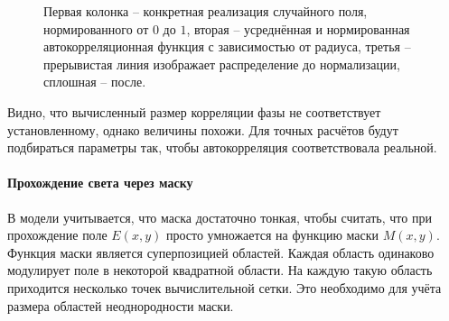 \begin{figure}[h]
	\caption{Первая колонка -- конкретная реализация случайного поля, нормированного от $0$ до $1$, вторая -- усреднённая и нормированная автокорреляционная функция с зависимостью от радиуса, третья -- прерывистая линия изображает распределение до нормализации, сплошная -- после.}
	\label{ris:IncoherentRAD}
\end{figure}
Видно, что вычисленный размер корреляции фазы не соответствует установленному, однако величины похожи. Для точных расчётов будут подбираться параметры так, чтобы автокорреляция соответствовала реальной.


\paragraph{Прохождение света через маску}
В модели учитывается, что маска достаточно тонкая, чтобы считать, что при прохождение поле $E(x,y)$ просто умножается на функцию маски $M(x,y)$. Функция маски является суперпозицией областей. Каждая область одинаково модулирует поле в некоторой квадратной области. На каждую такую область приходится несколько точек вычислительной сетки. Это необходимо для учёта размера областей неоднородности маски.




